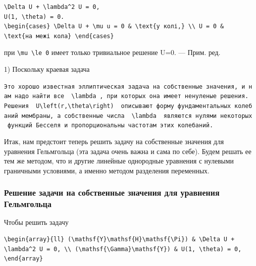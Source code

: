 \documentclass[
  ukrainian,
]{article}
\begin{document}
\begin{verbatim}
\Delta U + \lambda^2 U = 0,
U(1, \theta) = 0.
\begin{cases} \Delta U + \mu u = 0 & \text{у колі,} \\ U = 0 & \text{на межі кола} \end{cases}
\end{verbatim}

при \texttt{\textbackslash{}mu\ \textbackslash{}le\ 0} имеет только
тривиальное решение U=0. --- Прим. ред.

1) Поскольку краевая задача

\texttt{Это\ хорошо\ известная\ эллиптическая\ задача\ на\ собственные\ значения,\ и\ нам\ надо\ найти\ все\ \ \textquotesingle{}\textbackslash{}lambda\textquotesingle{}\ ,\ при\ которых\ она\ имеет\ ненуленые\ решения.\ Решения\ \ \textquotesingle{}U\textbackslash{}left(r,\textbackslash{}theta\textbackslash{}right)\textquotesingle{}\ \ описывают\ форму\ фундаментальных\ колебаний\ мембраны,\ а\ собственные\ числа\ \ \textquotesingle{}\textbackslash{}lambda\textquotesingle{}\ \ являются\ нулями\ некоторых\ функций\ Бесселя\ и\ пропорциональны\ частотам\ этих\ колебаний.}

Итак, нам предстоит теперь решить задачу на собственные значения для
уравнения Гельмгольца (эта задача очень важна и сама по себе). Будем
решать ее тем же методом, что и другие линейные однородные уравнения с
нулевыми граничными условиями, а именно методом разделения переменных.

\subsubsection{Решение задачи на собственные значения для уравнения
Гельмгольца}\label{ux440ux435ux448ux435ux43dux438ux435-ux437ux430ux434ux430ux447ux438-ux43dux430-ux441ux43eux431ux441ux442ux432ux435ux43dux43dux44bux435-ux437ux43dux430ux447ux435ux43dux438ux44f-ux434ux43bux44f-ux443ux440ux430ux432ux43dux435ux43dux438ux44f-ux433ux435ux43bux44cux43cux433ux43eux43bux44cux446ux430}

Чтобы решить задачу

\begin{verbatim}
\begin{array}{ll} (\mathsf{Y}\mathsf{H}\mathsf{\Pi}) & \Delta U + \lambda^2 U = 0, \\ (\mathsf{\Gamma}\mathsf{Y}) & U(1, \theta) = 0, \end{array}
\end{verbatim}
\end{document}
